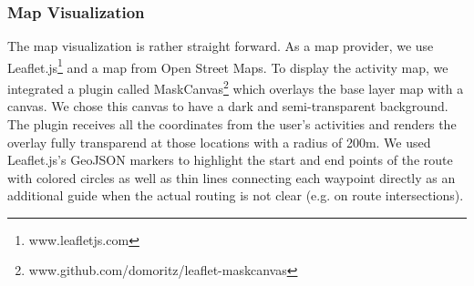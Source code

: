 \documentclass{sigchi}
\begin{document}
\subsubsection{Map Visualization}
The map visualization is rather straight forward. As a map provider, we use Leaflet.js\footnote{www.leafletjs.com} and a map from Open Street Maps. To display the activity map, we integrated a plugin called MaskCanvas\footnote{www.github.com/domoritz/leaflet-maskcanvas } which overlays the base layer map with a canvas. We chose this canvas to have a dark and semi-transparent background. The plugin receives all the coordinates from the user's activities and renders the overlay fully transparend at those locations with a radius of 200m. We used Leaflet.js's GeoJSON markers to highlight the start and end points of the route with colored circles as well as thin lines connecting each waypoint directly as an additional guide when the actual routing is not clear (e.g. on route intersections).
\end{document}
